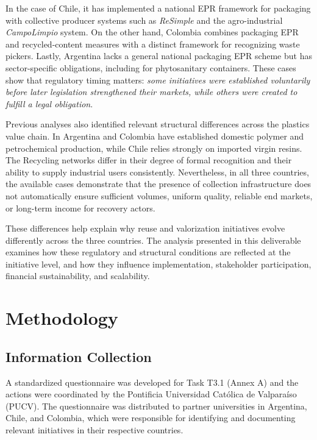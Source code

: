 \documentclass[
  12pt,
  oneside]{book}
\begin{document}
In the case of Chile, it has implemented a national EPR framework for
packaging with collective producer systems such as \emph{ReSimple} and
the agro-industrial \emph{CampoLimpio} system. On the other hand,
Colombia combines packaging EPR and recycled-content measures with a
distinct framework for recognizing waste pickers. Lastly, Argentina
lacks a general national packaging EPR scheme but has sector-specific
obligations, including for phytosanitary containers. These cases show
that regulatory timing matters: \emph{some initiatives were established
voluntarily before later legislation strengthened their markets, while
others were created to fulfill a legal obligation}.

Previous analyses also identified relevant structural differences across
the plastics value chain. In Argentina and Colombia have established
domestic polymer and petrochemical production, while Chile relies
strongly on imported virgin resins. The Recycling networks differ in
their degree of formal recognition and their ability to supply
industrial users consistently. Nevertheless, in all three countries, the
available cases demonstrate that the presence of collection
infrastructure does not automatically ensure sufficient volumes, uniform
quality, reliable end markets, or long-term income for recovery actors.

These differences help explain why reuse and valorization initiatives
evolve differently across the three countries. The analysis presented in
this deliverable examines how these regulatory and structural conditions
are reflected at the initiative level, and how they influence
implementation, stakeholder participation, financial sustainability, and
scalability.

\chapter{Methodology}\label{methodology}

\section{Information Collection}\label{information-collection}

A standardized questionnaire was developed for Task T3.1 (Annex A) and
the actions were coordinated by the Pontificia Universidad Católica de
Valparaíso (PUCV). The questionnaire was distributed to partner
universities in Argentina, Chile, and Colombia, which were responsible
for identifying and documenting relevant initiatives in their respective
countries.
\end{document}
